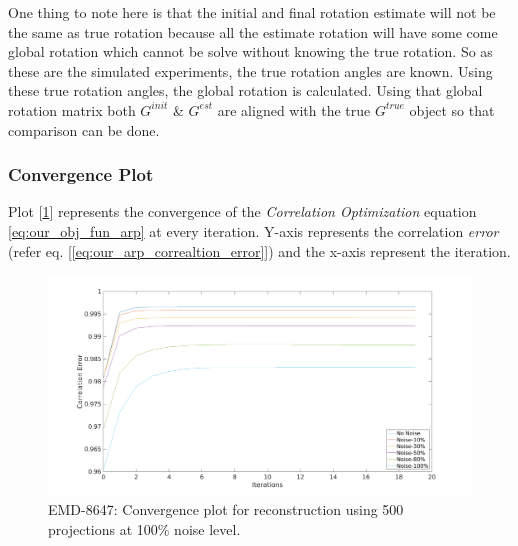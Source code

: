 \documentclass{report}
\begin{document}
One thing to note here is that the initial and final rotation estimate will not be the same as true rotation because all the estimate rotation will have some come global rotation which cannot be solve without knowing the true rotation. So as these are the simulated experiments, the true rotation angles are known. Using these true rotation angles, the global rotation is calculated. Using that global rotation matrix both  $G^{init}$ \&  $G^{est}$ are aligned with the true  $G^{true}$ object so that comparison can be done.

\subsubsection{Convergence Plot}
Plot [\ref{figplot:emd_8647_result_Bm3d_convergence}] represents the convergence of the \textit{Correlation Optimization} equation \ref{eq:our_obj_fun_arp} at every iteration. Y-axis represents the correlation \textit{error} (refer eq. [\ref{eq:our_arp_correaltion_error}]) and the x-axis represent the iteration.

\begin{figure}[H]
\includegraphics[width=1\textwidth]{emd_8647_result_Bm3d_convergence.png}
\centering
\captionsetup{justification=centering}
\caption{EMD-8647: Convergence plot for reconstruction using 500 projections at 100\% noise level. }
\label{figplot:emd_8647_result_Bm3d_convergence}
\end{figure}
\end{document}
